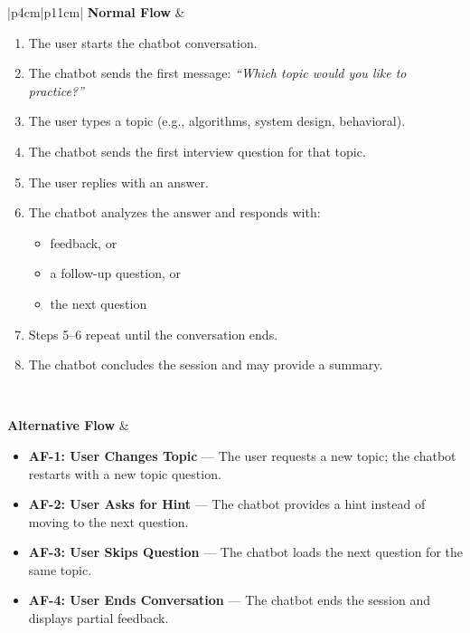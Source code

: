 \begin{table}[h!]
\begin{tabular}{|p{4cm}|p{11cm}|}
\textbf{Normal Flow} &
\begin{minipage}[t]{\linewidth}
\begin{enumerate}[nosep,leftmargin=*]
\setlength\itemsep{0pt}
    \item The user starts the chatbot conversation.
    \item The chatbot sends the first message:  
          \textit{“Which topic would you like to practice?”}
    \item The user types a topic (e.g., algorithms, system design, behavioral).
    \item The chatbot sends the first interview question for that topic.
    \item The user replies with an answer.
    \item The chatbot analyzes the answer and responds with:  
          \begin{itemize}[nosep,leftmargin=*]
          \setlength\itemsep{0pt}
            \item feedback, or
            \item a follow-up question, or
            \item the next question
          \end{itemize}
    \item Steps 5–6 repeat until the conversation ends.
    \item The chatbot concludes the session and may provide a summary.
\end{enumerate}
\vspace{2pt}
\end{minipage}
\\ \hline

\textbf{Alternative Flow} &
\begin{minipage}[t]{\linewidth}
\begin{itemize}[nosep,leftmargin=*]
\setlength\itemsep{0pt}
    \item \textbf{AF-1: User Changes Topic} — The user requests a new topic; the chatbot restarts with a new topic question.
    \item \textbf{AF-2: User Asks for Hint} — The chatbot provides a hint instead of moving to the next question.
    \item \textbf{AF-3: User Skips Question} — The chatbot loads the next question for the same topic.
    \item \textbf{AF-4: User Ends Conversation} — The chatbot ends the session and displays partial feedback.
\end{itemize}
\vspace{2pt}
\end{minipage}
\\ \hline


\end{tabular}
\end{table}

